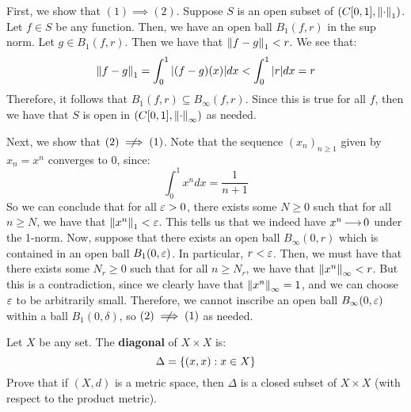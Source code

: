 \vspace{-0.2in}
\begin{soln}
    First, we show that $ (1) \implies (2) $.
    Suppose $ S $ is an open subset of $ (C[0, 1], \left\|\cdot\right\|_{1}) $.
    Let $ f \in S $ be any function.
    Then, we have an open ball $ B_{1}(f, r) $ in the sup norm.
    Let $ g \in B_{1}(f, r) $. Then we have that $ \left\|f - g\right\|_{1} < r $.
    We see that:
    \begin{equation*}
        \left\|f - g\right\|_{1} = \int_{0}^{1} \abs{(f - g)(x)} dx < \int_{0}^{1}
        \abs{r} dx = r
    \end{equation*}
    Therefore, it follows that $ B_{1}(f, r) \subseteq B_{\infty}(f, r) $.
    Since this is true for all $ f $, then we have that $ S $ is open in
    $ (C[0, 1], \left\|\cdot\right\|_{\infty}) $ as needed. \npgh

    Next, we show that $ (2) \cnot\implies (1) $. Note that the sequence
    $ (x_{n})_{n \geq 1} $ given by $ x_{n} = x^{n} $ converges to $ 0 $, since:
    \begin{equation*}
        \int_{0}^{1} x^{n} dx = \frac{1}{n + 1}
    \end{equation*}
    So we can conclude that for all $ \operatorname{\varepsilon} > 0 $, there exists some $ N \geq 0 $
    such that
    for all $ n \geq N $, we have that $ \left\|x^{n}\right\|_{1} < \operatorname{\varepsilon} $.
    This tells us that we indeed have $ x^{n} \operatorname{\longrightarrow} 0 $ under the 1-norm. \vsp
    Now, suppose that there exists an open ball $ B_{\infty}(0, r) $ which is
    contained in an open ball $ B_{1}(0, \operatorname{\varepsilon}) $. In particular, $ r < \operatorname{\varepsilon} $. \vsp
    Then, we must have that there exists some $ N_{r} \geq 0 $ such that for all
    $ n \geq N_{r} $,
    we have that $ \left\|x^{n}\right\|_{\infty} < r $. But this is a contradiction,
    since we clearly have that $ \left\|x^{n}\right\|_{\infty} = 1 $, and we can choose
    $ \operatorname{\varepsilon} $ to be arbitrarily small.
    Therefore, we cannot inscribe an open ball $ B_{\infty}(0, \operatorname{\varepsilon}) $ within
    a ball $ B_{1}(0, \delta) $, so $ (2) \cnot \implies (1) $ as needed.
\end{soln}


\newpage
\label{q8}
\begin{qu}[num=8]
    Let $ X $ be any set.
    The \textbf{diagonal} of $ X \times X $ is:
    \begin{equation*}
        \Delta = \left\{{(x, x) : x \in X}\right\}
    \end{equation*}
    Prove that if $ (X, d) $ is a metric space, then $ \Delta $ is a closed
    subset of $ X \times X $ (with respect to the product metric).
\end{qu}

